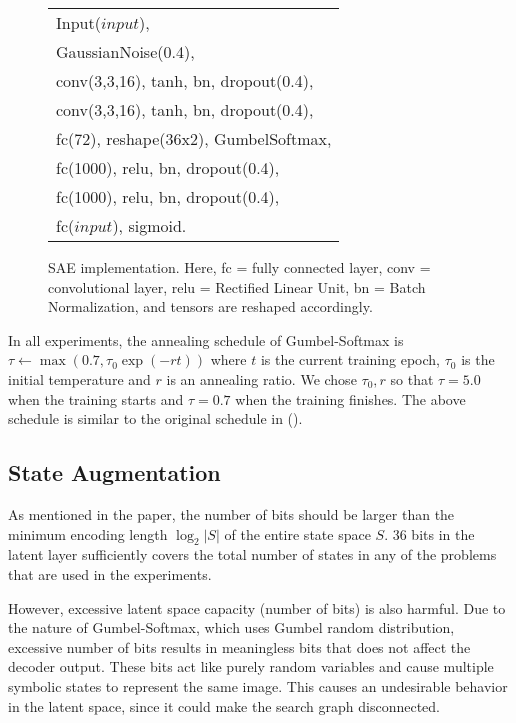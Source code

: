 \documentclass[11pt]{article}
\begin{document}
\begin{figure}[htb]
\centering
\begin{tabular}{|l|}
 Input($input$),\\
 GaussianNoise(0.4),\\
 conv(3,3,16), tanh, bn, dropout(0.4),\\
 conv(3,3,16), tanh, bn, dropout(0.4),\\
 fc(72), reshape(36x2), GumbelSoftmax,\\
 fc(1000), relu, bn, dropout(0.4),\\
 fc(1000), relu, bn, dropout(0.4),\\
 fc($input$), sigmoid.
\end{tabular}
\caption{SAE implementation.
 Here, fc = fully connected layer, conv = convolutional layer, 
relu = Rectified Linear Unit,
bn = Batch Normalization, %
and tensors are reshaped accordingly.}
\label{fig:sae-detail}
\end{figure}


In all experiments, 
the annealing schedule of Gumbel-Softmax is $\tau \leftarrow \max (0.7, \tau_0\exp(-rt))$ where
 $t$ is the current training epoch, $\tau_0$ is the initial temperature and $r$ is an annealing ratio.
We chose $\tau_0,r$ so that $\tau = 5.0$ when the training starts and $\tau = 0.7$ when the training finishes.
The above schedule is similar to the original schedule in  \citeauthor{jang2016categorical} (\citeyear{jang2016categorical}).

\subsection{State Augmentation}

As mentioned in the paper, the number of bits should be larger than the minimum encoding length $\log_2 |S|$
of the entire state space $S$.
36 bits in the latent layer sufficiently covers
the total number of states in any of the problems that are used in the experiments.

However, excessive latent space capacity (number of bits) is also harmful.
Due to the nature of Gumbel-Softmax, which uses Gumbel random distribution,
excessive number of bits results in meaningless bits that does not affect the decoder output.
These bits act like purely random variables and cause multiple symbolic states to represent the same image.
This causes an undesirable behavior in the latent space,
since it could make the search graph disconnected.
\end{document}
